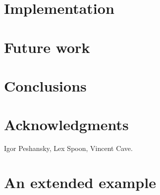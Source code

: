 \documentclass[nocopyrightspace,preprint,9pt]{sigplanconf}
\begin{document}
\section{Implementation}
\label{sec:implementation}


\section{Future work}
\label{sec:future}


\section{Conclusions}
\label{sec:conclusions}


\section*{Acknowledgments}

Igor Peshansky,
Lex Spoon,
Vincent Cave.




\balance
\appendix
\onecolumn

\section{An extended example}

\end{document}
